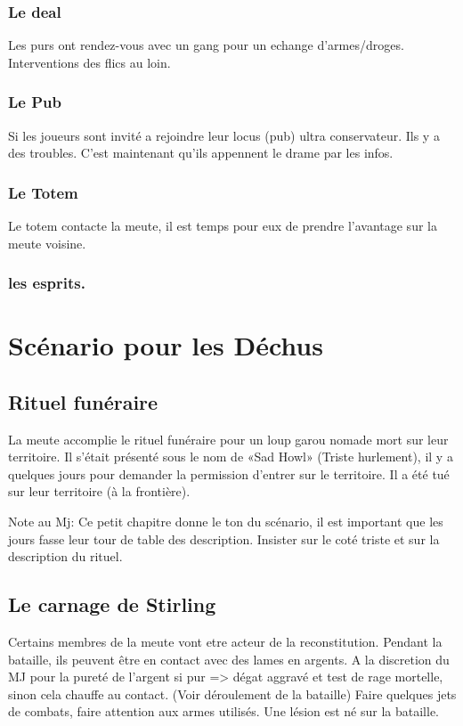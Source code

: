 \documentclass[oneside,12pt]{book}
\begin{document}
\begin{flushleft}
\subsection{Le deal}
Les purs ont rendez-vous avec un gang pour un echange d'armes/droges. Interventions des flics au loin.

\subsection{Le Pub}
Si les joueurs sont invité a rejoindre leur locus (pub) ultra conservateur. Ils y a des troubles. 
C'est maintenant qu'ils appennent le drame par les infos. 

\subsection{Le Totem}
Le totem contacte la meute, il est temps pour eux de prendre l'avantage sur la meute voisine.


\subsection{les esprits.}





\chapter{Scénario pour les Déchus}

\section{Rituel funéraire}
La meute accomplie le rituel funéraire pour un loup garou nomade mort sur leur territoire. 
Il s'était présenté sous le nom de «Sad Howl» (Triste hurlement), il y a quelques jours pour demander la permission d'entrer sur le territoire. Il a été tué sur leur territoire (à la frontière). 

Note au Mj: Ce petit chapitre donne le ton du scénario, il est important que les jours fasse leur tour de table des description. Insister sur le coté triste et sur la description du rituel.


\section{Le carnage de Stirling}
Certains membres de la meute vont etre acteur de la reconstitution. Pendant la bataille, ils peuvent être en contact avec des lames en argents.
A la discretion du MJ pour la pureté de l'argent si pur => dégat aggravé et test de rage mortelle, sinon cela chauffe au contact.
(Voir déroulement de la bataille) 
Faire quelques jets de combats, faire attention aux armes utilisés.  Une lésion est né sur la bataille. 


\end{flushleft}
\end{document}
